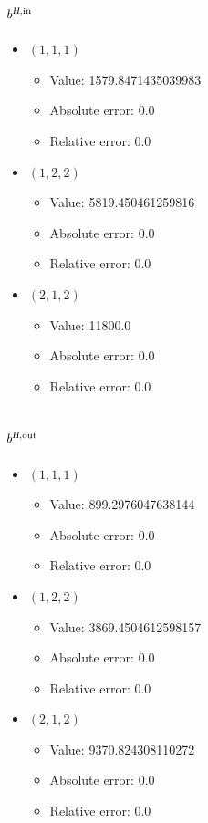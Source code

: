 \documentclass{article}%
\begin{document}
\subsection{$b^{\textsl{H},\text{in}}$}%
\begin{itemize}%
	\item $(1, 1, 1)$%
	\begin{itemize}%
		\item Value: 1579.8471435039983%
		\item Absolute error: 0.0%
		\item Relative error: 0.0%
	\end{itemize}%
	\item $(1, 2, 2)$%
	\begin{itemize}%
		\item Value: 5819.450461259816%
		\item Absolute error: 0.0%
		\item Relative error: 0.0%
	\end{itemize}%
	\item $(2, 1, 2)$%
	\begin{itemize}%
		\item Value: 11800.0%
		\item Absolute error: 0.0%
		\item Relative error: 0.0%
	\end{itemize}%
\end{itemize}%
\subsection{$b^{\textsl{H},\text{out}}$}%
\begin{itemize}%
	\item $(1, 1, 1)$%
	\begin{itemize}%
		\item Value: 899.2976047638144%
		\item Absolute error: 0.0%
		\item Relative error: 0.0%
	\end{itemize}%
	\item $(1, 2, 2)$%
	\begin{itemize}%
		\item Value: 3869.4504612598157%
		\item Absolute error: 0.0%
		\item Relative error: 0.0%
	\end{itemize}%
	\item $(2, 1, 2)$%
	\begin{itemize}%
		\item Value: 9370.824308110272%
		\item Absolute error: 0.0%
		\item Relative error: 0.0%
	\end{itemize}%
\end{itemize}%
\end{document}
